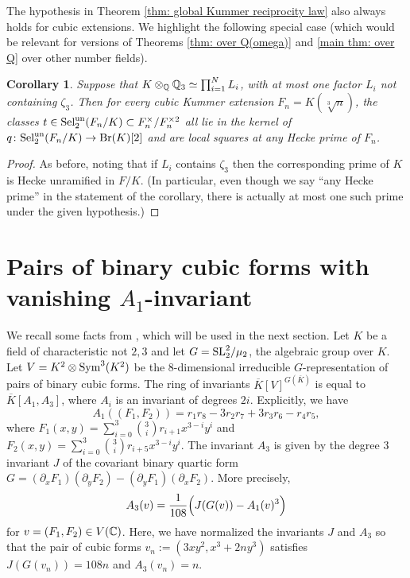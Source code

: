 \documentclass[11pt,a4paper]{amsart}
\def\Q{{\rm \mathbb{Q}}}
\def\C{{\rm \mathbb{C}}}
\def\un{{\rm un}}
\def\Br{{\rm Br}}
\def\SL{{\rm SL}}
\def\Sym{{\rm Sym}}
\def\Sel{{\rm Sel}}
\numberwithin{equation}{section}
\newtheorem{corollary}[theorem]{Corollary}
\begin{document}
The hypothesis in Theorem \ref{thm: global Kummer reciprocity law} also always holds for cubic extensions. We highlight the following special case (which would be relevant for versions of Theorems \ref{thm: over Q(omega)} and \ref{main thm: over Q} over other number fields).
\begin{corollary}\label{cor: Kummer cubic global result}
    \label{thm: cubic Kummer brauer obstruction over number fields}
Suppose that $K \otimes_\Q \Q_3 \simeq \prod_{i = 1}^N L_i$, with at most one factor $L_i$ not containing $\zeta_3$.  Then for every cubic Kummer extension $F_n = K(\sqrt[3]{n})$, the classes $t \in \Sel_2^\un(F_n/K) \subset F_n^\times/F_n^{\times 2}$ all lie in the kernel of $q \colon \Sel_2^\un(F_n/K) \to \Br(K)[2]$ and are local squares at any Hecke prime of $F_n$. 
\end{corollary}
\begin{proof}
    As before, noting that if $L_i$ contains $\zeta_3$ then the corresponding prime of $K$ is Hecke unramified in $F/K$. (In particular, even though we say ``any Hecke prime'' in the statement of the corollary, there is actually at most one such prime under the given hypothesis.) 
\end{proof}



\section{Pairs of binary cubic forms with vanishing $A_1$-invariant}\label{sec: counting pairs of binary cubics}

We recall some facts from \cite[\S3-4]{AlpogeBhargavaShnidman}, which will be used in the next section. Let $K$ be a field of characteristic not $2,3$ and let $G = \SL_2^2/\mu_2$, the algebraic group over $K$. Let $V = K^2 \otimes \Sym^3(K^2)$ be the $8$-dimensional irreducible $G$-representation of pairs of binary cubic forms. The ring of invariants $\overline{K}[V]^{G(\overline{K})}$ is equal to $\overline{K}[A_1,A_3]$, where $A_i$ is an invariant of degrees $2i$. Explicitly, we have
\begin{equation}\label{A1formula}
    A_1((F_1,F_2)) = r_1 r_8 - 3r_2 r_7 + 3r_3 r_6 - r_4 r_5,
    \end{equation}
where $F_1(x,y) = \sum_{i=0}^3 \binom3ir_{i+1} x^{3-i} y^i$ and $F_2(x,y) = \sum_{i=0}^3 \binom3i r_{i+5} x^{3-i} y^i$. The invariant $A_3$ is given by the degree 3 invariant $J$ of the covariant binary quartic form $G = (\partial_xF_1)(\partial_yF_2) - (\partial_yF_1)(\partial_xF_2)$. More precisely, 
\begin{equation}\label{A3formula}A_3(v) =  \frac{1} {108}\Bigl(J(G(v))- A_1(v)^3\Bigr)\end{equation}
for $v = (F_1,F_2) \in V(\C)$.  Here, we have normalized the invariants $J$ and $A_3$ so that the pair of cubic forms $v_n := (3xy^2,x^3 + 2ny^3)$ satisfies $J(G(v_n)) = 108n$ and $A_3(v_n) = n$.
\end{document}
